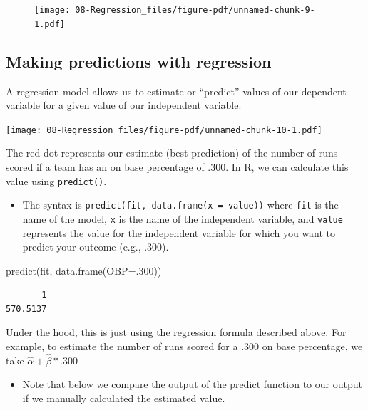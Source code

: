 \documentclass[
  letterpaper,
  DIV=11,
  numbers=noendperiod]{scrreprt}
\newenvironment{Shaded}{\begin{snugshade}}{\end{snugshade}}
\newcommand{\AttributeTok}[1]{\textcolor[rgb]{0.40,0.45,0.13}{#1}}
\newcommand{\DecValTok}[1]{\textcolor[rgb]{0.68,0.00,0.00}{#1}}
\newcommand{\FunctionTok}[1]{\textcolor[rgb]{0.28,0.35,0.67}{#1}}
\newcommand{\NormalTok}[1]{\textcolor[rgb]{0.00,0.23,0.31}{#1}}
\providecommand{\tightlist}{%
  \setlength{\itemsep}{0pt}\setlength{\parskip}{0pt}}\usepackage{longtable,booktabs,array}
\begin{document}
\begin{figure}[H]

{\centering \texttt{[image: 08-Regression\_files/figure-pdf/unnamed-chunk-9-1.pdf]}

}

\end{figure}

\hypertarget{making-predictions-with-regression}{%
\subsection{Making predictions with
regression}\label{making-predictions-with-regression}}

A regression model allows us to estimate or ``predict'' values of our
dependent variable for a given value of our independent variable.

\texttt{[image: 08-Regression\_files/figure-pdf/unnamed-chunk-10-1.pdf]}

The red dot represents our estimate (best prediction) of the number of
runs scored if a team has an on base percentage of .300. In R, we can
calculate this value using \texttt{predict()}.

\begin{itemize}
\tightlist
\item
  The syntax is \texttt{predict(fit,\ data.frame(x\ =\ value))} where
  \texttt{fit} is the name of the model, \texttt{x} is the name of the
  independent variable, and \texttt{value} represents the value for the
  independent variable for which you want to predict your outcome (e.g.,
  .300).
\end{itemize}

\begin{Shaded}
\begin{Highlighting}[]
\FunctionTok{predict}\NormalTok{(fit, }\FunctionTok{data.frame}\NormalTok{(}\AttributeTok{OBP=}\NormalTok{.}\DecValTok{300}\NormalTok{))}
\end{Highlighting}
\end{Shaded}

\begin{verbatim}
       1 
570.5137 
\end{verbatim}

Under the hood, this is just using the regression formula described
above. For example, to estimate the number of runs scored for a .300 on
base percentage, we take \(\hat \alpha + \hat \beta * .300\)

\begin{itemize}
\tightlist
\item
  Note that below we compare the output of the predict function to our
  output if we manually calculated the estimated value.
\end{itemize}
\end{document}
